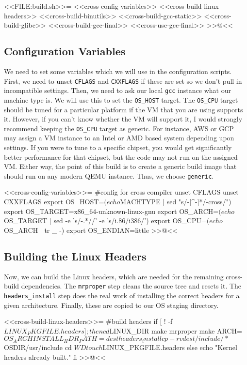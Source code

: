 <<FILE:build.sh>>=
    <<cross-config-variables>>
    <<cross-build-linux-headers>>
    <<cross-build-binutils>>
    <<cross-build-gcc-static>>
    <<cross-build-glibc>>
    <<cross-build-gcc-final>>
    <<cross-use-gcc-final>>
>>@<<

\subsection{Configuration Variables}

We need to set some variables which we will use in the configuration scripts.
First, we need to unset \verb/CFLAGS/ and \verb/CXXFLAGS/ if these are set so we
don't pull in incompatible settings.  Then, we need to ask our local \verb/gcc/
instance what our machine type is.  We will use this to set the \verb/OS_HOST/
target.  The \verb/OS_CPU/ target should be tuned for a particular platform if
the VM that you are using supports it.  However, if you can't know whether the
VM will support it, I would strongly recommend keeping the \verb/OS_CPU/ target
as generic.  For instance, AWS or GCP may assign a VM instance to an Intel or
AMD based system depending upon settings.  If you were to tune to a specific
chipset, you would get significantly better performance for that chipset, but
the code may not run on the assigned VM.  Either way, the point of this build is
to create a generic build image that should run on any modern QEMU instance.
Thus, we choose \verb/generic/.

<<cross-config-variables>>=
#config for cross compiler
unset CFLAGS
unset CXXFLAGS
export OS_HOST=$(echo ${MACHTYPE} | sed "s/-[^-]*/-cross/")
export OS_TARGET=x86_64-unknown-linux-gnu
export OS_ARCH=$(echo ${OS_TARGET} | sed -e 's/-.*//' -e 's/i.86/i386/')
export OS_CPU=$(echo ${OS_ARCH} | tr _ -)
export OS_ENDIAN=little
>>@<<

\subsection{Building the Linux Headers}

Now, we can build the Linux headers, which are needed for the remaining
cross-build dependencies.  The \verb/mrproper/ step cleans the source tree and
resets it. The \verb/headers_install/ step does the real work of installing the
correct headers for a given architecture.  Finally, these are copied to our OS
staging directory.

<<cross-build-linux-headers>>=
#build headers
if [ ! -f ${LINUX_PKGFILE}.headers ]; then
    cd ${LINUX_DIR}
    make mrproper
    make ARCH=${OS_ARCH} INSTALL_HDR_PATH=dest headers_install
    cp -rv dest/include/* ${OSDIR}/usr/include
    cd ${WD}
    touch ${LINUX_PKGFILE}.headers
else
    echo "Kernel headers already built."
fi
>>@<<

